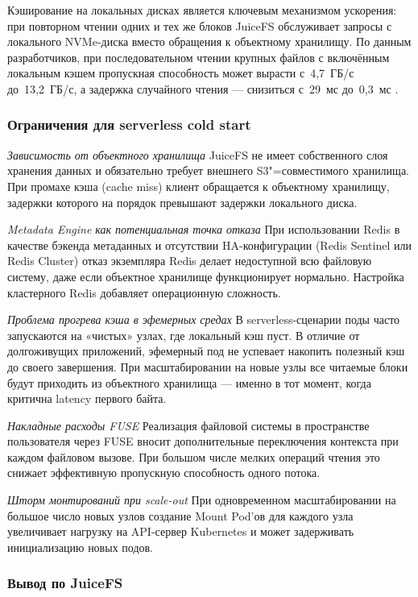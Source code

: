 Кэширование на локальных дисках является ключевым механизмом ускорения: при повторном чтении одних и тех же блоков JuiceFS обслуживает запросы с локального NVMe-диска вместо обращения к объектному хранилищу. По данным разработчиков, при последовательном чтении крупных файлов с включённым локальным кэшем пропускная способность может вырасти с~4{,}7~ГБ/с до~13{,}2~ГБ/с, а задержка случайного чтения --- снизиться с~29~мс до~0{,}3~мс \cite{juicefs_perf}.

\subsubsection{Ограничения для serverless cold start}

\textit{Зависимость от объектного хранилища} JuiceFS не имеет собственного слоя хранения данных и обязательно требует внешнего S3"=совместимого хранилища. При промахе кэша (cache miss) клиент обращается к объектному хранилищу, задержки которого на порядок превышают задержки локального диска.

\textit{Metadata Engine как потенциальная точка отказа} При использовании Redis в качестве бэкенда метаданных и отсутствии HA-конфигурации (Redis Sentinel или Redis Cluster) отказ экземпляра Redis делает недоступной всю файловую систему, даже если объектное хранилище функционирует нормально. Настройка кластерного Redis добавляет операционную сложность.

\textit{Проблема прогрева кэша в эфемерных средах} В serverless-сценарии поды часто запускаются на «чистых» узлах, где локальный кэш пуст. В отличие от долгоживущих приложений, эфемерный под не успевает накопить полезный кэш до своего завершения. При масштабировании на новые узлы все читаемые блоки будут приходить из объектного хранилища --- именно в тот момент, когда критична latency первого байта.

\textit{Накладные расходы FUSE} Реализация файловой системы в пространстве пользователя через FUSE вносит дополнительные переключения контекста при каждом файловом вызове. При большом числе мелких операций чтения это снижает эффективную пропускную способность одного потока.

\textit{Шторм монтирований при scale-out} При одновременном масштабировании на большое число новых узлов создание Mount Pod'ов для каждого узла увеличивает нагрузку на API-сервер Kubernetes и может задерживать инициализацию новых подов.

\subsubsection{Вывод по JuiceFS}

